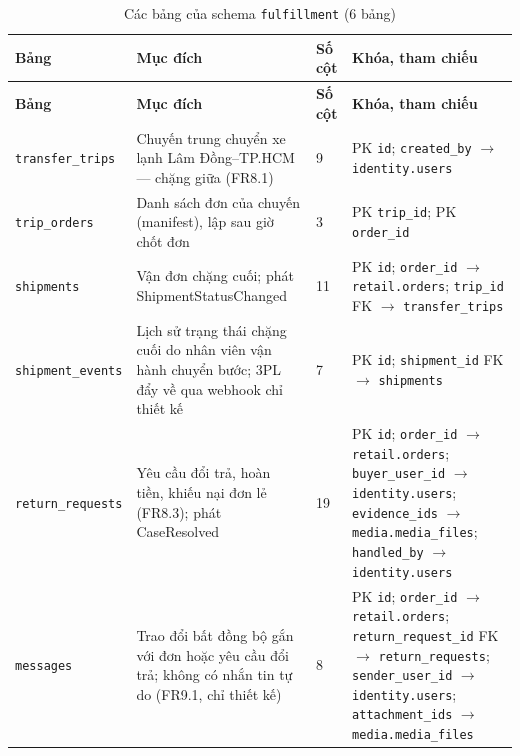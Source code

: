 \begingroup
\tblsetup\footnotesize\renewcommand{\arraystretch}{1.1}
\begin{longtable}{L{3.20cm} L{5.60cm} L{1.10cm} L{5.00cm}}
\caption{Các bảng của schema \texttt{fulfillment} (6 bảng)}
\label{tab:db-fulfillment} \\
\toprule
{}
\textbf{Bảng} & \textbf{Mục đích} & \textbf{Số cột} & \textbf{Khóa, tham chiếu} \\
\midrule
\endfirsthead
\toprule
{}
\textbf{Bảng} & \textbf{Mục đích} & \textbf{Số cột} & \textbf{Khóa, tham chiếu} \\
\midrule
\endhead
\bottomrule
\endfoot
\texttt{transfer\_\allowbreak{}trips} & Chuyến trung chuyển xe lạnh Lâm Đồng--TP.HCM — chặng giữa (FR8.1) & 9 & PK \texttt{id}; \texttt{created\_\allowbreak{}by} $\to$ \texttt{identity.users} \\
\texttt{trip\_\allowbreak{}orders} & Danh sách đơn của chuyến (manifest), lập sau giờ chốt đơn & 3 & PK \texttt{trip\_\allowbreak{}id}; PK \texttt{order\_\allowbreak{}id} \\
\texttt{shipments} & Vận đơn chặng cuối; phát ShipmentStatusChanged & 11 & PK \texttt{id}; \texttt{order\_\allowbreak{}id} $\to$ \texttt{retail.orders}; \texttt{trip\_\allowbreak{}id} FK $\to$ \texttt{transfer\_\allowbreak{}trips} \\
\texttt{shipment\_\allowbreak{}events} & Lịch sử trạng thái chặng cuối do nhân viên vận hành chuyển bước; 3PL đẩy về qua webhook chỉ thiết kế & 7 & PK \texttt{id}; \texttt{shipment\_\allowbreak{}id} FK $\to$ \texttt{shipments} \\
\texttt{return\_\allowbreak{}requests} & Yêu cầu đổi trả, hoàn tiền, khiếu nại đơn lẻ (FR8.3); phát CaseResolved & 19 & PK \texttt{id}; \texttt{order\_\allowbreak{}id} $\to$ \texttt{retail.orders}; \texttt{buyer\_\allowbreak{}user\_\allowbreak{}id} $\to$ \texttt{identity.users}; \texttt{evidence\_\allowbreak{}ids} $\to$ \texttt{media.media\_\allowbreak{}files}; \texttt{handled\_\allowbreak{}by} $\to$ \texttt{identity.users} \\
\texttt{messages} & Trao đổi bất đồng bộ gắn với đơn hoặc yêu cầu đổi trả; không có nhắn tin tự do (FR9.1, chỉ thiết kế) & 8 & PK \texttt{id}; \texttt{order\_\allowbreak{}id} $\to$ \texttt{retail.orders}; \texttt{return\_\allowbreak{}request\_\allowbreak{}id} FK $\to$ \texttt{return\_\allowbreak{}requests}; \texttt{sender\_\allowbreak{}user\_\allowbreak{}id} $\to$ \texttt{identity.users}; \texttt{attachment\_\allowbreak{}ids} $\to$ \texttt{media.media\_\allowbreak{}files} \\
\end{longtable}
\endgroup

